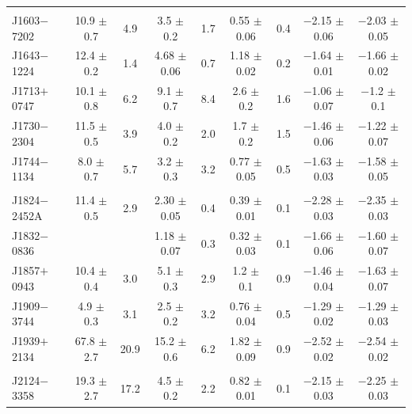 \begin{landscape}
\begin{table}
\begin{tabular}{lcccccccc}
               &	                 &        &                   &       &                  &        &                     &                     \\   
 J1603$-$7202  &  10.9  $\pm$ 0.7  &  4.9   &  3.5   $\pm$ 0.2  &  1.7  &  0.55 $\pm$ 0.06 &  0.4   &  $-$2.15 $\pm$ 0.06 &  $-$2.03 $\pm$ 0.05 \\ 
 J1643$-$1224  &  12.4  $\pm$ 0.2  &  1.4   &  4.68  $\pm$ 0.06 &  0.7  &  1.18 $\pm$ 0.02 &  0.2   &  $-$1.64 $\pm$ 0.01 &  $-$1.66 $\pm$ 0.02 \\ 
 J1713$+$0747  &  10.1  $\pm$ 0.8  &  6.2   &  9.1   $\pm$ 0.7  &  8.4  &  2.6  $\pm$ 0.2  &  1.6   &  $-$1.06 $\pm$ 0.07 &  $-$1.2  $\pm$ 0.1 \\ 
 J1730$-$2304  &  11.5  $\pm$ 0.5  &  3.9   &  4.0   $\pm$ 0.2  &  2.0  &  1.7  $\pm$ 0.2  &  1.5   &  $-$1.46 $\pm$ 0.06 &  $-$1.22 $\pm$ 0.07 \\ 
 J1744$-$1134  &  8.0   $\pm$ 0.7  &  5.7   &  3.2   $\pm$ 0.3  &  3.2  &  0.77 $\pm$ 0.05 &  0.5   &  $-$1.63 $\pm$ 0.03 &  $-$1.58 $\pm$ 0.05 \\ 
               &	                 &        &                   &       &                  &        &                     &                     \\  
 J1824$-$2452A &  11.4  $\pm$ 0.5  &  2.9   &  2.30  $\pm$ 0.05 &  0.4  &  0.39 $\pm$ 0.01 &  0.1   &  $-$2.28 $\pm$ 0.03 &  $-$2.35 $\pm$ 0.03 \\ 
 J1832$-$0836  &	                 &        &  1.18  $\pm$ 0.07 &  0.3  &  0.32 $\pm$ 0.03 &  0.1   &  $-$1.66 $\pm$ 0.06 &  $-$1.60 $\pm$ 0.07 \\ 
 J1857$+$0943  &  10.4  $\pm$ 0.4  &  3.0   &  5.1   $\pm$ 0.3  &  2.9  &  1.2  $\pm$ 0.1  &  0.9   &  $-$1.46 $\pm$ 0.04 &  $-$1.63 $\pm$ 0.07 \\ 
 J1909$-$3744  &  4.9   $\pm$ 0.3  &  3.1   &  2.5   $\pm$ 0.2  &  3.2  &  0.76 $\pm$ 0.04 &  0.5   &  $-$1.29 $\pm$ 0.02 &  $-$1.29 $\pm$ 0.03 \\ 
 J1939$+$2134  &  67.8  $\pm$ 2.7  &  20.9  &  15.2  $\pm$ 0.6  &  6.2  &  1.82 $\pm$ 0.09 &  0.9   &  $-$2.52 $\pm$ 0.02 &  $-$2.54 $\pm$ 0.02 \\ 
               &	                 &        &                   &       &                  &        &                     &                     \\   
 J2124$-$3358  &  19.3  $\pm$ 2.7  &  17.2  &  4.5   $\pm$ 0.2  &  2.2  &  0.82 $\pm$ 0.01 &  0.1   &  $-$2.15 $\pm$ 0.03 &  $-$2.25 $\pm$ 0.03 \\ 

\end{tabular}
\end{table}
\end{landscape}
